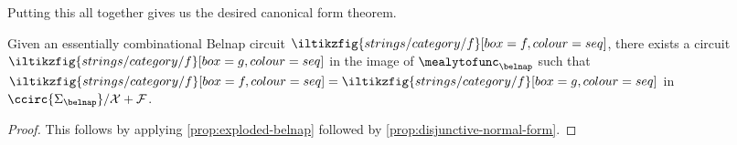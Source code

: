 Putting this all together gives us the desired canonical form theorem.

\begin{theorem}
    Given an essentially combinational Belnap circuit \(
    \iltikzfig{strings/category/f}[box=f,colour=seq]
    \), there exists a circuit \(
    \iltikzfig{strings/category/f}[box=g,colour=seq]
    \) in the image of \(\mealytofunc_\belnap\) such that \(
    \iltikzfig{strings/category/f}[box=f,colour=seq]
    =
    \iltikzfig{strings/category/f}[box=g,colour=seq]
    \) in \(\ccirc{\Sigma_\belnap} / \mathcal{X} + \mathcal{F}\).
\end{theorem}
\begin{proof}
    This follows by applying \cref{prop:exploded-belnap} followed by
    \cref{prop:disjunctive-normal-form}.
\end{proof}

